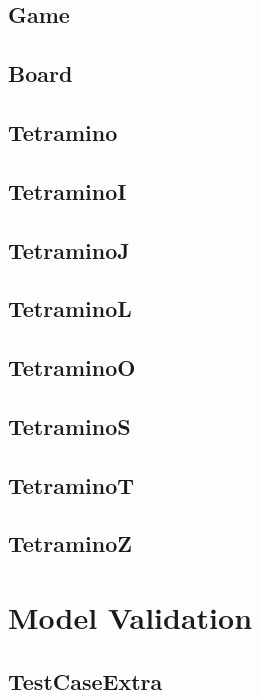 \documentclass[a4paper]{article}
\begin{document}
\subsection{Game}

\subsection{Board}

\subsection{Tetramino}

\subsection{TetraminoI}

\subsection{TetraminoJ}

\subsection{TetraminoL}

\subsection{TetraminoO}

\subsection{TetraminoS}

\subsection{TetraminoT}

\subsection{TetraminoZ}


\section{Model Validation}

\subsection{TestCaseExtra}

\end{document}
